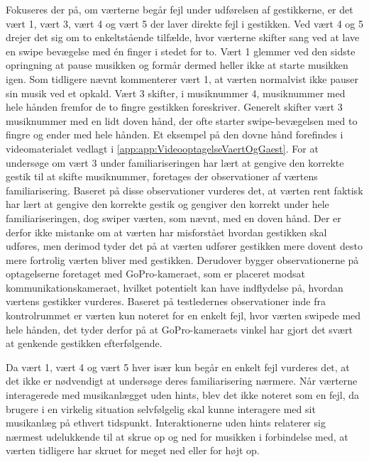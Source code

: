 Fokuseres der på, om værterne begår fejl under udførelsen af gestikkerne, er det vært 1, vært 3, vært 4 og vært 5 der laver direkte fejl i gestikken. Ved vært 4 og 5 drejer det sig om to enkeltstående tilfælde, hvor værterne skifter sang ved at lave en swipe bevægelse med én finger i stedet for to. Vært 1 glemmer ved den sidste opringning at pause musikken og formår dermed heller ikke at starte musikken igen. Som tidligere nævnt kommenterer vært 1, at værten normalvist ikke pauser sin musik ved et opkald. Vært 3 skifter, i musiknummer 4, musiknummer med hele hånden fremfor de to fingre gestikken foreskriver. Generelt skifter vært 3 musiknummer med en lidt doven hånd, der ofte starter swipe-bevægelsen med to fingre og ender med hele hånden. Et eksempel på den dovne hånd forefindes i videomaterialet vedlagt i \autoref{app:app:VideooptagelseVaertOgGaest}. For at undersøge om vært 3 under familiariseringen har lært at gengive den korrekte gestik til at skifte musiknummer, foretages der observationer af værtens familiarisering. Baseret på disse observationer vurderes det, at værten rent faktisk har lært at gengive den korrekte gestik og gengiver den korrekt under hele familiariseringen, dog swiper værten, som nævnt, med en doven hånd. Der er derfor ikke mistanke om at værten har misforstået hvordan gestikken skal udføres, men derimod tyder det på at værten udfører gestikken mere dovent desto mere fortrolig værten bliver med gestikken. Derudover bygger observationerne på optagelserne foretaget med GoPro-kameraet, som er placeret modsat kommunikationskameraet, hvilket potentielt kan have indflydelse på, hvordan værtens gestikker vurderes. Baseret på testledernes observationer inde fra kontrolrummet er værten kun noteret for en enkelt fejl, hvor værten swipede med hele hånden, det tyder derfor på at GoPro-kameraets vinkel har gjort det svært at genkende gestikken efterfølgende. 

Da vært 1, vært 4 og vært 5 hver især kun begår en enkelt fejl vurderes det, at det ikke er nødvendigt at undersøge deres familiarisering nærmere.\blankline
%
Når værterne interagerede med musikanlægget uden hints, blev det ikke noteret som en fejl, da brugere i en virkelig situation selvfølgelig skal kunne interagere med sit musikanlæg på ethvert tidspunkt. Interaktionerne uden hints relaterer sig nærmest udelukkende til at skrue op og ned for musikken i forbindelse med, at værten tidligere har skruet for meget ned eller for højt op. 

